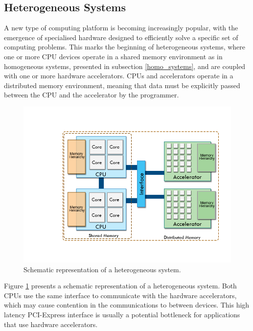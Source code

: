 \subsection{Heterogeneous Systems}
\label{hetero_systems}

A new type of computing platform is becoming increasingly popular, with the emergence of specialised hardware designed to efficiently solve a specific set of computing problems. This marks the beginning of heterogeneous systems, where one or more CPU devices operate in a shared memory environment as in homogeneous systems, presented in subsection \ref{homo_systems}, and are coupled with one or more hardware accelerators. CPUs and accelerators operate in a distributed memory environment, meaning that data must be explicitly passed between the CPU and the accelerator by the programmer.

\begin{figure}[!htp]
	\begin{center}
		\includegraphics[scale=0.45]{imgs/heteroplats.png}
		\caption{Schematic representation of a heterogeneous system.}
		\label{fig:heteroplat}
	\end{center}
\end{figure}

Figure \ref{fig:heteroplat} presents a schematic representation of a heterogeneous system. Both CPUs use the same interface to communicate with the hardware accelerators, which may cause contention in the communications to between devices. This high latency PCI-Express interface is usually a potential bottleneck for applications that use hardware accelerators.

